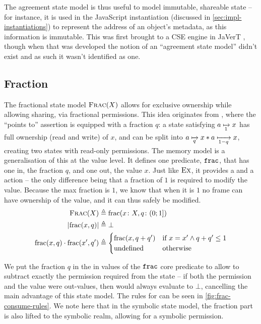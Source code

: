 The agreement state model is thus useful to model immutable, shareable state -- for instance, it is used in the JavaScript instantiation (discussed in \cref{sec:impl-instantiations}) to represent the address of an object's metadata, as this information is immutable. This was first brought to a CSE engine in JaVerT \cite{javert1,javert2}, though when that was developed the notion of an ``agreement state model'' didn't exist and as such it wasn't identified as one.

\subsection{Fraction}

The fractional state model $\textsc{Frac}(X)$ allows for exclusive ownership while allowing sharing, via fractional permissions. This idea originates from \cite{fracpermissions,fracpermissions2}, where the ``points to'' assertion is equipped with a fraction $q$: a state satisfying $a\mapstoq{1}x$ has full ownership (read and write) of $x$, and can be split into $a\mapstoq{q}x * a\mapstoq{1-q}x$, creating two states with read-only permissions. The \Frac{} memory model is a generalisation of this at the value level. It defines one predicate, $\texttt{frac}$, that has one in, the fraction $q$, and one out, the value $x$. Just like $\textsc{Ex}$, it provides a \load{} and a \store{} action -- the only difference being that a fraction of $1$ is required to modify the value. Because the max fraction is $1$, we know that when it is $1$ no frame can have ownership of the value, and it can thus safely be modified.
\begin{align*}
	\textsc{Frac}(X)&\triangleq \text{frac}(x\colon X, q\colon (0;1])\\
	|\text{frac}(x, q)| &\triangleq \bot\\
	\text{frac}(x,q)\cdot\text{frac}(x',q')&\triangleq \begin{cases}
		\text{frac}(x,q+q') & \text{if}~ x=x' \land q+q' \leq 1\\
		\text{undefined} &\text{otherwise}
	\end{cases}
\end{align*}

We put the fraction $q$ in the in values of the $\texttt{frac}$ core predicate to allow \consume{} to subtract exactly the permission required from the state -- if both the permission and the value were out-values, then \consume{} would always evaluate to $\bot$, cancelling the main advantage of this state model. The rules for \consume{} can be seen in \autoref{fig:frac-consume-rules}. We note here that in the symbolic state model, the fraction part is also lifted to the symbolic realm, allowing for a symbolic permission.

